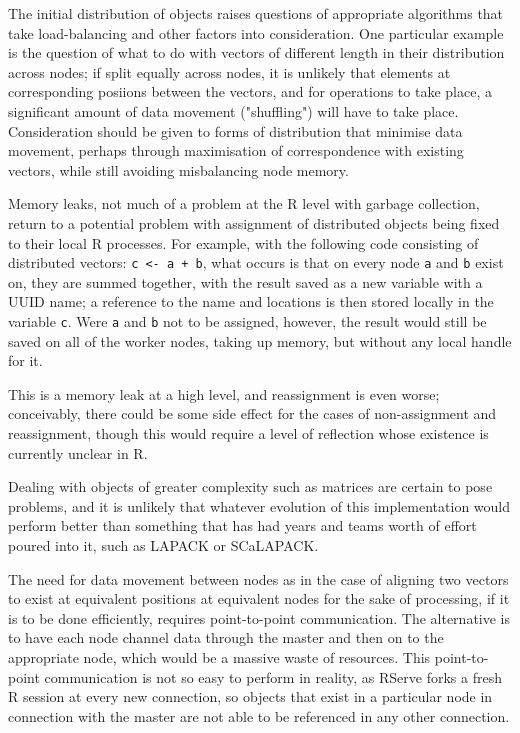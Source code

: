 \documentclass[a4paper,10pt]{article}
\begin{document}
The initial distribution of objects raises questions of appropriate algorithms
that take load-balancing and other factors into consideration.
One particular example is the question of what to do with vectors of different
length in their distribution across nodes;
if split equally across nodes, it is unlikely that elements at corresponding
posiions between the vectors, and for operations to take place, a significant
amount of data movement ("shuffling") will have to take place.
Consideration should be given to forms of distribution that minimise data
movement, perhaps through maximisation of correspondence with existing vectors,
while still avoiding misbalancing node memory.

Memory leaks, not much of a problem at the R level with garbage collection,
return to a potential problem with assignment of distributed objects being
fixed to their local R processes.
For example, with the following code consisting of distributed vectors:
\texttt{c <- a + b}, what occurs is that on every node \texttt{a} and
\texttt{b} exist on, they are summed together, with the result saved as a new
variable with a UUID name; a reference to the name and locations is then stored
locally in the variable \texttt{c}.
Were \texttt{a} and \texttt{b} not to be assigned, however, the result would
still be saved
on all of the worker nodes, taking up memory, but without any local handle for
it.

This is a memory leak at a high level, and reassignment is even worse;
conceivably, there could be some side effect for the cases of non-assignment
and reassignment, though this would require a level of reflection whose
existence is currently unclear in R.

Dealing with objects of greater complexity such as matrices are certain to pose
problems, and it is unlikely that whatever evolution of this implementation
would perform better than something that has had years and teams worth of
effort poured into it, such as LAPACK or SCaLAPACK.

The need for data movement between nodes as in the case of aligning two vectors
to exist at equivalent positions at equivalent nodes for the sake of
processing, if it is to be done efficiently, requires point-to-point
communication.
The alternative is to have each node channel data through the master and then
on to the appropriate node, which would be a massive waste of resources.
This point-to-point communication is not so easy to perform in reality, as
RServe forks a fresh R session at every new connection, so objects that exist
in a particular node in connection with the master are not able to be
referenced in any other connection.
\end{document}
